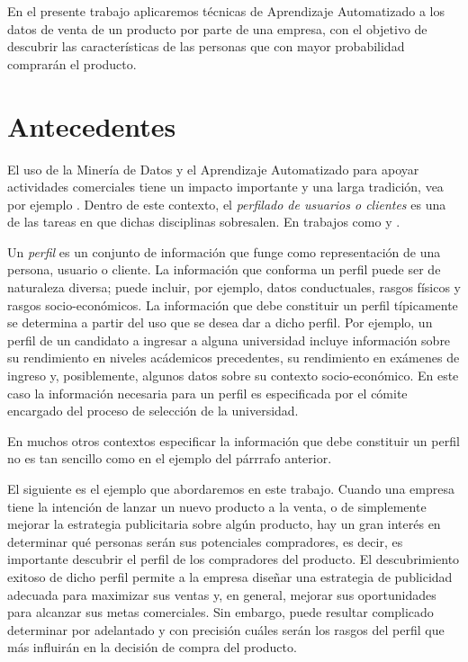 \documentclass[twocolumn, letterpaper,11pt]{article}
\begin{document}
En el presente trabajo aplicaremos técnicas de Aprendizaje Automatizado a los datos de venta de un producto por parte de una empresa, 
con el objetivo de descubrir las características de las personas que con mayor probabilidad comprarán el producto. 


\section{Antecedentes}
El uso de la Minería de Datos y el Aprendizaje Automatizado para apoyar actividades comerciales tiene un impacto
importante y una larga tradición, vea por ejemplo \cite{berry}\cite{big}\cite{tdk}.  Dentro de este contexto, el 
\emph{perfilado de usuarios o clientes} es una de las tareas en que dichas disciplinas sobresalen. En trabajos como
\cite{faw} y \cite{discov}.  

Un \emph{perfil} es un conjunto de información que funge como representación de una persona, usuario o cliente\cite{cufo}. La información que
conforma un perfil puede ser de naturaleza diversa; puede incluir, por ejemplo, datos conductuales, rasgos físicos y rasgos
socio-económicos. La información que debe constituir un perfil típicamente se determina a partir del uso que
se desea dar a dicho perfil. Por ejemplo, un perfil de un candidato a ingresar a alguna universidad
incluye información sobre su rendimiento en niveles acádemicos precedentes, su rendimiento en exámenes de ingreso y, 
posiblemente, algunos datos sobre su contexto socio-económico. En este caso la información necesaria para un perfil es
especificada por el cómite encargado del proceso de selección de la universidad. 

En muchos otros contextos especificar la información que debe constituir un perfil no es tan sencillo como en
el ejemplo del párrrafo anterior. 


El siguiente es el ejemplo que abordaremos en este trabajo. Cuando una empresa tiene la intención de lanzar un nuevo
producto a la venta, o de simplemente mejorar la estrategia publicitaria sobre algún producto, 
hay un gran interés en determinar qué personas serán sus potenciales compradores, es decir, es importante descubrir el perfil de los compradores 
del producto. El descubrimiento exitoso de dicho perfil permite a la empresa diseñar una estrategia de publicidad adecuada
para maximizar sus ventas y, en general, mejorar sus oportunidades para alcanzar sus metas comerciales.  Sin embargo, puede resultar
complicado determinar por adelantado y con precisión cuáles serán los rasgos del perfil que más influirán en la decisión
de compra del producto. 
\end{document}
